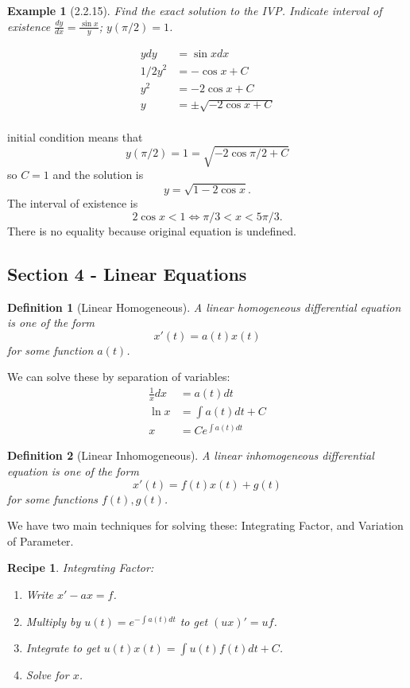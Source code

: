 \documentclass[14pt]{article}
\newtheorem{defn}{Definition}
\newtheorem{re}{Recipe}
\newtheorem{ex}{Example}
\begin{document}
\begin{ex}[2.2.15] Find the exact solution to the IVP. Indicate interval of existence $ \frac{dy}{dx} = \frac{\sin x}{y}$; $y(\pi / 2 ) = 1$.\end{ex}

\begin{align*}
ydy &= \sin x dx \\
1/2 y^2 &= -\cos x + C \\
y^2 &= -2 \cos x + C \\
y &= \pm \sqrt{-2 \cos x + C } \\ 
\end{align*}

initial condition means that 
\[y(\pi /2 )  = 1 = \sqrt{-2 \cos \pi / 2 + C}\]
so $C =1$ and the solution is 
\[y = \sqrt{1 - 2 \cos x}.\]
The interval of existence is 
\[2 \cos x < 1 \Leftrightarrow \pi / 3 < x < 5 \pi /3 .\]
There is no equality because original equation is undefined.

\addtocounter{subsection}{1}
\subsection{Section 4 - Linear Equations}

\begin{defn}[Linear Homogeneous] A \emph{linear homogeneous} differential equation is one of the form \[x'(t) = a(t) x(t) \] for some function $a(t)$. \end{defn}

We can solve these by separation of variables:
\begin{align*} 
\frac{1}{x} dx &= a(t) dt \\ 
\ln x &= \int a(t) dt + C \\
x &= C e^{\int a(t) dt}
\end{align*}

\begin{defn}[Linear Inhomogeneous] A \emph{linear inhomogeneous} differential equation is one of the form \[x'(t) = f(t) x(t) + g(t) \] for some functions $f(t), g(t)$. \end{defn}

We have two main techniques for solving these: Integrating Factor, and Variation of Parameter.

\begin{re} Integrating Factor:
\begin{enumerate} 
\item Write $x' - ax = f$.
\item Multiply by $u(t) = e^{- \int a(t) dt}$ to get $ (u x)' = uf $.
\item Integrate to get $u(t) x(t) = \int u(t) f(t) dt + C $.
\item Solve for $x$. 
\end{enumerate}
\end{re}
\end{document}
